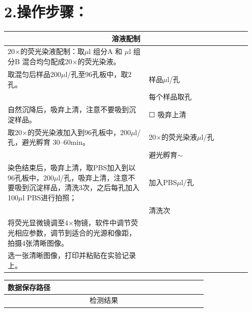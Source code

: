 \documentclass[UTF8,10pt,a4paper,fontset=fandol]{ctexart}
\newcommand{\fieldvalue}[1]{#1}
\newcommand{\checkboxfield}[1]{\ifstrequal{#1}{checked}{☑}{\ifstrequal{#1}{unclear}{?}{☐}}}
\begin{document}
\section*{2.\quad 操作步骤：}

\begin{center}
\begin{tabular}{|p{0.55\linewidth}|p{0.40\linewidth}|}
\hline
\multicolumn{2}{|c|}{溶液配制}\\
\hline
20$\times$的荧光染液配制：取\underline{\hspace{1.2cm}}$\mu$l 组分A 和
\underline{\hspace{1.2cm}}$\mu$l 组分B 混合均匀配成20$\times$的荧光染液。 &
\\
\hline
取混匀后样品200$\mu$l/孔至96孔板中，取2孔。 &
样品\underline{\hspace{1.2cm}}$\mu$l/孔\\
& 每个样品取\underline{\hspace{1.2cm}}孔\\
\hline
自然沉降后，吸弃上清，注意不要吸到沉淀样品。 &
\fieldvalue{\checkboxfield{unchecked}} 吸弃上清\\
\hline
取20$\times$的荧光染液加入到96孔板中，200$\mu$l/孔，避光孵育
30--60min。 &
20$\times$的荧光染液\underline{\hspace{1.2cm}}$\mu$l/孔\\
& 避光孵育\underline{\hspace{0.7cm}}$\sim$\underline{\hspace{0.7cm}}\\
\hline
染色结束后，吸弃上清，取PBS加入到以96孔板中，200$\mu$l/孔，吸弃上清，注意不要吸到沉淀样品，清洗3次，之后每孔加入100$\mu$l PBS进行拍照； &
加入PBS\underline{\hspace{1.2cm}}$\mu$l/孔\\
& 清洗\underline{\hspace{1.2cm}}次\\
\hline
将荧光显微镜调至4$\times$物镜，软件中调节荧光相应参数，调节到适合的光源和像距，拍摄4张清晰图像。 &
\\
\hline
选一张清晰图像，打印并粘贴在实验记录上。 &
\\
\hline
\end{tabular}
\end{center}

\begin{tabular}{|p{0.25\linewidth}|p{0.70\linewidth}|}
\hline
数据保存路径 & \\
\hline
\multicolumn{2}{|c|}{检测结果}\\
\hline
\end{tabular}
\end{document}
